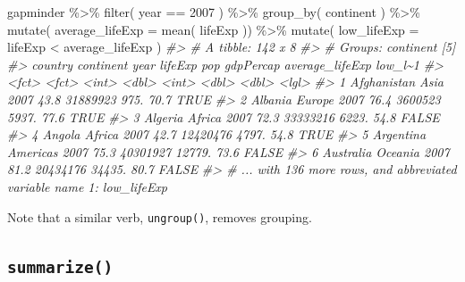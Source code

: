 \documentclass[
]{book}
\newenvironment{Shaded}{\begin{snugshade}}{\end{snugshade}}
\newcommand{\AttributeTok}[1]{\textcolor[rgb]{0.77,0.63,0.00}{#1}}
\newcommand{\CommentTok}[1]{\textcolor[rgb]{0.56,0.35,0.01}{\textit{#1}}}
\newcommand{\DecValTok}[1]{\textcolor[rgb]{0.00,0.00,0.81}{#1}}
\newcommand{\FunctionTok}[1]{\textcolor[rgb]{0.00,0.00,0.00}{#1}}
\newcommand{\NormalTok}[1]{#1}
\newcommand{\SpecialCharTok}[1]{\textcolor[rgb]{0.00,0.00,0.00}{#1}}
\begin{document}
\begin{Shaded}
\begin{Highlighting}[]
\NormalTok{gapminder }\SpecialCharTok{\%\textgreater{}\%}
  \FunctionTok{filter}\NormalTok{( year }\SpecialCharTok{==} \DecValTok{2007}\NormalTok{ ) }\SpecialCharTok{\%\textgreater{}\%}
  \FunctionTok{group\_by}\NormalTok{( continent ) }\SpecialCharTok{\%\textgreater{}\%}
  \FunctionTok{mutate}\NormalTok{( }\AttributeTok{average\_lifeExp =} \FunctionTok{mean}\NormalTok{( lifeExp )) }\SpecialCharTok{\%\textgreater{}\%}
  \FunctionTok{mutate}\NormalTok{( }\AttributeTok{low\_lifeExp =}\NormalTok{ lifeExp }\SpecialCharTok{\textless{}}\NormalTok{ average\_lifeExp )}
\CommentTok{\#\textgreater{} \# A tibble: 142 x 8}
\CommentTok{\#\textgreater{} \# Groups:   continent [5]}
\CommentTok{\#\textgreater{}   country     continent  year lifeExp      pop gdpPercap average\_lifeExp low\_l\textasciitilde{}1}
\CommentTok{\#\textgreater{}   \textless{}fct\textgreater{}       \textless{}fct\textgreater{}     \textless{}int\textgreater{}   \textless{}dbl\textgreater{}    \textless{}int\textgreater{}     \textless{}dbl\textgreater{}           \textless{}dbl\textgreater{} \textless{}lgl\textgreater{}  }
\CommentTok{\#\textgreater{} 1 Afghanistan Asia       2007    43.8 31889923      975.            70.7 TRUE   }
\CommentTok{\#\textgreater{} 2 Albania     Europe     2007    76.4  3600523     5937.            77.6 TRUE   }
\CommentTok{\#\textgreater{} 3 Algeria     Africa     2007    72.3 33333216     6223.            54.8 FALSE  }
\CommentTok{\#\textgreater{} 4 Angola      Africa     2007    42.7 12420476     4797.            54.8 TRUE   }
\CommentTok{\#\textgreater{} 5 Argentina   Americas   2007    75.3 40301927    12779.            73.6 FALSE  }
\CommentTok{\#\textgreater{} 6 Australia   Oceania    2007    81.2 20434176    34435.            80.7 FALSE  }
\CommentTok{\#\textgreater{} \# ... with 136 more rows, and abbreviated variable name 1: low\_lifeExp}
\end{Highlighting}
\end{Shaded}

Note that a similar verb, \texttt{ungroup()}, removes grouping.

\hypertarget{summarize}{%
\subsection*{\texorpdfstring{\texttt{summarize()}}{summarize()}}\label{summarize}}
\end{document}
